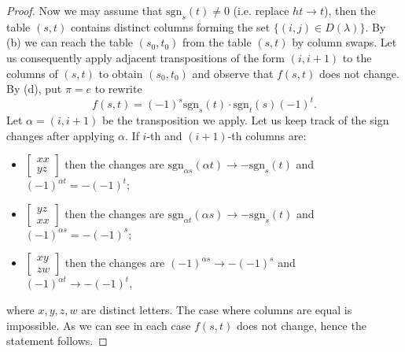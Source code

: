 \documentclass[10pt,a4paper]{amsart}
\newcommand{\sgn}{\mathrm{sgn}}
\begin{document}
\begin{proof}
    Now we may assume that $\sgn_s(t) \neq 0$ (i.e. replace $ht \to t$), then the table $(s,t)$ contains distinct columns forming  the set $\{(i,j)\in D(\lambda)\}$. %
    By (b) we can reach the table $(s_0,t_0)$ from the table $(s,t)$ by column swaps. Let us consequently apply adjacent transpositions of the form $(i,i+1)$ to the columns of $(s,t)$ to obtain $(s_0, t_0)$ and observe that $f(s,t)$ does not change. By (d), put $\pi = e$ to rewrite
    $$
        f(s,t) = (-1)^s \sgn_s(t) \cdot \sgn_t(s) (-1)^t.
    $$
    Let $\alpha=(i,i+1)$ be the transposition we apply. Let us keep track of the sign changes after applying $\alpha$. If $i$-th and $(i+1)$-th columns are: 
    \begin{itemize}
        \item $\begin{bmatrix}
            xx\\
            yz
        \end{bmatrix}$ then the changes are $\sgn_{\alpha s}(\alpha t) \to -\sgn_s(t)$ and $(-1)^{\alpha t} = -(-1)^t$;
        \item $\begin{bmatrix}
            yz\\
            xx
        \end{bmatrix}$ then the changes are $\sgn_{\alpha t}(\alpha s) \to -\sgn_s(t)$ and $(-1)^{\alpha s} = -(-1)^s$;
        \item $\begin{bmatrix}
            xy\\
            zw
        \end{bmatrix}$ then the changes are $(-1)^{\alpha s} \to -(-1)^s$ and $(-1)^{\alpha t} \to -(-1)^{t}$,
    \end{itemize}
    where $x,y,z,w$ are distinct letters.
    The case where columns are equal is impossible. As we can see in each case $f(s,t)$ does not change, hence the statement follows.
\end{proof}
\end{document}
